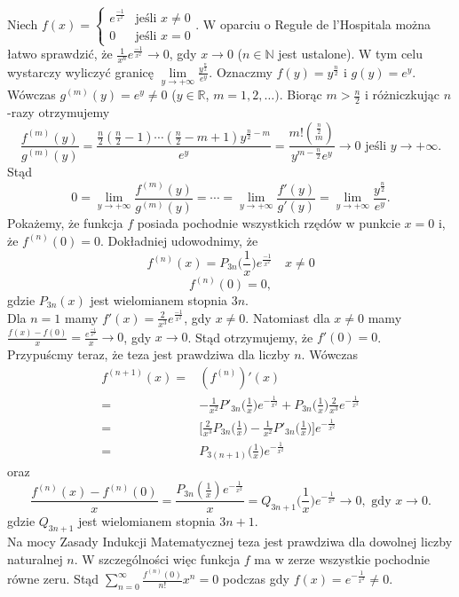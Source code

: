 \documentclass[leqno]{article}
\begin{document}
\begin{justify}
\begin{ex}
    Niech $f(x) = 
    \begin{cases}
        e^{\frac{-1}{x^2}} & \text{jeśli } x \neq 0 \\
        0& \text{jeśli } x = 0
    \end{cases}$. W oparciu o Regułe de l'Hospitala można łatwo sprawdzić, że $\frac{1}{x^n}e^{\frac{-1}{x^2}} \to 0$, gdy $x \to 0$ ($n \in \mathbb{N}$ jest ustalone). 
    W tym celu wystarczy wyliczyć granicę $\lim\limits_{y \to +\infty}\frac{y^{\frac{n}{2}}}{e^y}$. Oznaczmy $f(y) = y^{\frac{n}{2}}$ i $g(y) = e^y$. Wówczas
    $g^{(m)}(y) = e^y \neq 0$ ($y \in \mathbb{R}$, $m = 1,2,\ldots)$. Biorąc $m > \frac{n}{2}$ i różniczkując $n$-razy otrzymujemy
    \[
        \frac{f^{(m)}(y)}{g^{(m)}(y)} = \frac{\frac{n}{2}(\frac{n}{2}-1)\cdots(\frac{n}{2}-m + 1)y^{\frac{n}{2}-m}}{e^y} =
        \frac{m! \binom{\frac{n}{2}}{m}}{y^{m - \frac{n}{2}}e^y} \to 0 \text{ jeśli } y \to +\infty.
    \]
    Stąd 
    \[
        0 = \lim_{y \to +\infty}\frac{f^{(m)}(y)}{g^{(m)}(y)} = \cdots = \lim_{y \to +\infty}\frac{f'(y)}{g'(y)} = \lim_{y \to +\infty}\frac{y^{\frac{n}{2}}}{e^y}.
    \]
    Pokażemy, że funkcja $f$ posiada pochodnie wszystkich rzędów w punkcie $x = 0$ i, że $f^{(n)}(0) = 0$. Dokładniej udowodnimy, że 
    \[
        f^{(n)}(x) = P_{3n}\Big(\frac{1}{x}\Big)e^{\frac{-1}{x^2}}  \quad x \neq 0
    \]
    \[
        f^{(n)}(0) = 0,
    \]
    gdzie $P_{3n}(x)$ jest wielomianem stopnia $3n$. \\
    Dla $n = 1$ mamy $f'(x) = \frac{2}{x^3}e^{\frac{-1}{x^2}}$, gdy $x \neq 0$. 
    Natomiast dla $x \neq 0$ mamy $\frac{f(x) - f(0)}{x} = \frac{e^{\frac{-1}{x^2}}}{x} \to 0$, gdy $x \to 0$. Stąd otrzymujemy, że
    $f'(0) = 0$. \\
    Przypuścmy teraz, że teza jest prawdziwa dla liczby $n$. Wówczas
    \begin{align*}
        f^{(n+1)}(x) =& (f^{(n)})'(x) \\
        =& -\frac{1}{x^2}P'_{3n}\Big(\frac{1}{x}\Big)e^{-\frac{1}{x^2}} + P_{3n}\Big(\frac{1}{x}\Big)\frac{2}{x^3}e^{-\frac{1}{x^2}} \\
        =& \Bigg[ \frac{2}{x^3}P_{3n}\Big(\frac{1}{x}\Big) - \frac{1}{x^2}P'_{3n}\Big(\frac{1}{x}\Big)\Bigg]e^{-\frac{1}{x^2}} \\
        =& P_{3(n+1)}\Big(\frac{1}{x}\Big)e^{-\frac{1}{x^2}}
    \end{align*}
    oraz 
    \[
        \frac{f^{(n)}(x) - f^{(n)}(0)}{x} = \frac{P_{3n}(\frac{1}{x})e^{-\frac{1}{x^2}}}{x} = Q_{3n+1}\Big(\frac{1}{x}\Big)e^{-\frac{1}{x^2}} \to 0, \text{ gdy } x \to 0.
    \]
    gdzie $Q_{3n+1}$ jest wielomianem stopnia $3n + 1$. \\
    Na mocy Zasady Indukcji Matematycznej teza jest prawdziwa dla dowolnej liczby naturalnej $n$. W szczególności więc funkcja $f$ ma w zerze 
    wszystkie pochodnie równe zeru. Stąd $\sum\limits_{n=0}^{\infty}\frac{f^{(n)}(0)}{n!}x^n = 0$ podczas gdy $f(x) = e^{-\frac{1}{x^2}} \neq 0$.
\end{ex}


\end{justify}
\end{document}

